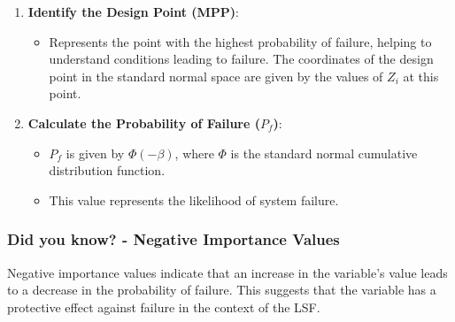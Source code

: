 \begin{enumerate}
    \item \textbf{Identify the Design Point (MPP)}:
    \begin{itemize}
        \item Represents the point with the highest probability of failure, helping to understand conditions leading to failure. The coordinates of the design point in the standard normal space are given by the values of \( Z_i \) at this point.
    \end{itemize}

    \item \textbf{Calculate the Probability of Failure (\( P_f \))}:
    \begin{itemize}
        \item \( P_f \) is given by \( \Phi(-\beta) \), where \( \Phi \) is the standard normal cumulative distribution function.
        \item This value represents the likelihood of system failure.
    \end{itemize}
\end{enumerate}


\subsubsection*{Did you know? - Negative Importance Values}
\begin{mdframed}[backgroundcolor=gray!20] 
Negative importance values indicate that an increase in the variable's value leads to a decrease in the probability of failure. This suggests that the variable has a protective effect against failure in the context of the LSF.
\end{mdframed}